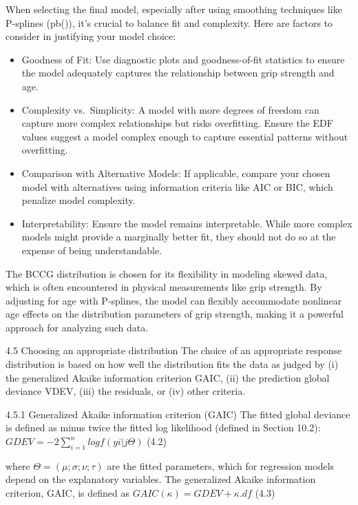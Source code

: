 \documentclass[
]{article}
\begin{document}
When selecting the final model, especially after using smoothing
techniques like P-splines (pb()), it's crucial to balance fit and
complexity. Here are factors to consider in justifying your model
choice:

\begin{itemize}
\item
  Goodness of Fit: Use diagnostic plots and goodness-of-fit statistics
  to ensure the model adequately captures the relationship between grip
  strength and age.
\item
  Complexity vs.~Simplicity: A model with more degrees of freedom can
  capture more complex relationships but risks overfitting. Ensure the
  EDF values suggest a model complex enough to capture essential
  patterns without overfitting.
\item
  Comparison with Alternative Models: If applicable, compare your chosen
  model with alternatives using information criteria like AIC or BIC,
  which penalize model complexity.
\item
  Interpretability: Ensure the model remains interpretable. While more
  complex models might provide a marginally better fit, they should not
  do so at the expense of being understandable.
\end{itemize}

The BCCG distribution is chosen for its flexibility in modeling skewed
data, which is often encountered in physical measurements like grip
strength. By adjusting for age with P-splines, the model can flexibly
accommodate nonlinear age effects on the distribution parameters of grip
strength, making it a powerful approach for analyzing such data.

4.5 Choosing an appropriate distribution The choice of an appropriate
response distribution is based on how well the distribution fits the
data as judged by (i) the generalized Akaike information criterion GAIC,
(ii) the prediction global deviance VDEV, (iii) the residuals, or (iv)
other criteria.

4.5.1 Generalized Akaike information criterion (GAIC) The fitted global
deviance is defined as minus twice the fitted log likelihood (defined in
Section 10.2): \(GDEV = -2 \sum^{n}_{i=1} log f(yi | j\Theta)\) (4.2)

where \(\Theta = (\mu; \sigma; \nu; \tau )\) are the fitted parameters,
which for regression models depend on the explanatory variables. The
generalized Akaike information criterion, GAIC, is defined as
\(GAIC(\kappa) = GDEV + \kappa . df\) (4.3)
\end{document}
